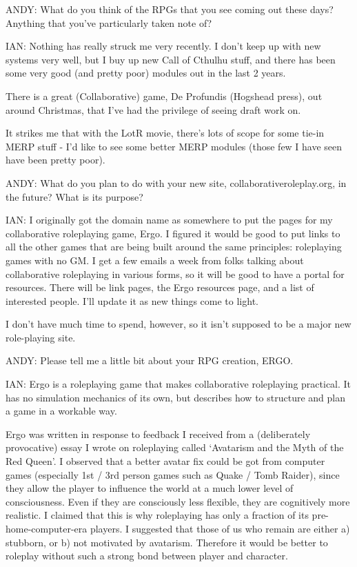 \documentclass[twoside]{book}
\begin{document}
\begin{description}
\item{ANDY:} What do you think of the RPGs that you see coming out these days? Anything that you've particularly taken note of?

\item{IAN:} Nothing has really struck me very recently. I don't keep up with new systems very well, but I buy up new Call of Cthulhu stuff, and there has been some very good (and pretty poor) modules out in the last 2 years.

There is a great (Collaborative) game, De Profundis (Hogshead press), out around Christmas, that I've had the privilege of seeing draft work on.

It strikes me that with the LotR movie, there's lots of scope for some tie-in MERP stuff - I'd like to see some better MERP modules (those few I have seen have been pretty poor).

\item{ANDY:} What do you plan to do with your new site, collaborativeroleplay.org, in the future? What is its purpose?

\item{IAN:} I originally got the domain name as somewhere to put the pages for my collaborative roleplaying game, Ergo. I figured it would be good to put links to all the other games that are being built around the same principles: roleplaying games with no GM. I get a few emails a week from folks talking about collaborative roleplaying in various forms, so it will be good to have a portal for resources. There will be link pages, the Ergo resources page, and a list of interested people. I'll update it as new things come to light.

I don't have much time to spend, however, so it isn't supposed to be a major new role-playing site.

\item{ANDY:} Please tell me a little bit about your RPG creation, ERGO.

\item{IAN:} Ergo is a roleplaying game that makes collaborative roleplaying practical. It has no simulation mechanics of its own, but describes how to structure and plan a game in a workable way.

Ergo was written in response to feedback I received from a (deliberately provocative) essay I wrote on roleplaying called `Avatarism and the Myth of the Red Queen'. I observed that a better avatar fix could be got from computer games (especially 1st / 3rd person games such as Quake / Tomb Raider), since they allow the player to influence the world at a much lower level of consciousness. Even if they are consciously less flexible, they are cognitively more realistic. I claimed that this is why roleplaying has only a fraction of its pre-home-computer-era players. I suggested that those of us who remain are either a) stubborn, or b) not motivated by avatarism. Therefore it would be better to roleplay without such a strong bond between player and character.


\end{description}
\end{document}
